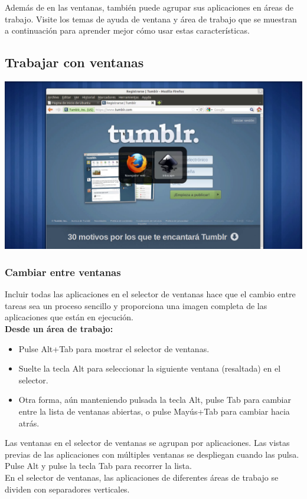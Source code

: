 Además de en las ventanas, también puede agrupar sus aplicaciones en áreas de trabajo. Visite los temas de ayuda de ventana y área de trabajo que se muestran a continuación para aprender mejor cómo usar estas características.

\subsection{Trabajar con ventanas}
\begin{center}
\includegraphics[scale=0.3]{img/ventanas.png} 
\end{center}
\subsubsection{Cambiar entre ventanas}
Incluir todas las aplicaciones en el selector de ventanas hace que el cambio entre tareas sea un proceso sencillo y proporciona una imagen completa de las aplicaciones que están en ejecución.\\

{\bf Desde un área de trabajo:}
\begin{itemize}
\item Pulse Alt+Tab para mostrar el selector de ventanas.
\item Suelte la tecla Alt para seleccionar la siguiente ventana (resaltada) en el selector.
\item Otra forma, aún manteniendo pulsada la tecla Alt, pulse Tab para cambiar entre la lista de ventanas abiertas, o pulse Mayús+Tab para cambiar hacia atrás.
\end{itemize}
Las ventanas en el selector de ventanas se agrupan por aplicaciones. Las vistas previas de las aplicaciones con múltiples ventanas se despliegan cuando las pulsa. Pulse Alt y pulse la tecla Tab para recorrer la lista.\\
En el selector de ventanas, las aplicaciones de diferentes áreas de trabajo se dividen con separadores verticales.

